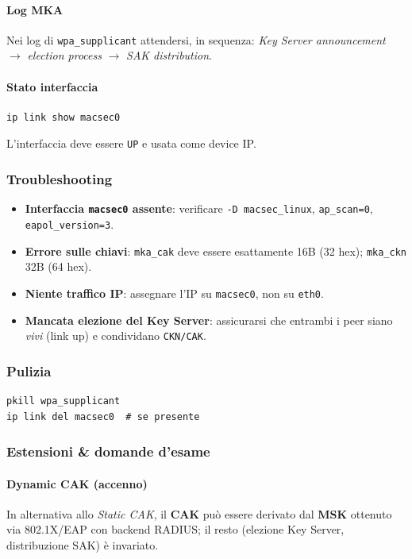 \paragraph{Log MKA}
Nei log di \texttt{wpa\_supplicant} attendersi, in sequenza: \emph{Key Server announcement} $\rightarrow$ \emph{election process} $\rightarrow$ \emph{SAK distribution}. %
\paragraph{Stato interfaccia}
\begin{verbatim}
ip link show macsec0
\end{verbatim}
L'interfaccia deve essere \texttt{UP} e usata come device IP. %

\subsubsection{Troubleshooting}
\begin{itemize}
  \item \textbf{Interfaccia \texttt{macsec0} assente}: verificare \texttt{-D macsec\_linux}, \texttt{ap\_scan=0}, \texttt{eapol\_version=3}. %
  \item \textbf{Errore sulle chiavi}: \texttt{mka\_cak} deve essere esattamente 16B (32 hex); \texttt{mka\_ckn} 32B (64 hex). %
  \item \textbf{Niente traffico IP}: assegnare l'IP su \texttt{macsec0}, non su \texttt{eth0}. %
  \item \textbf{Mancata elezione del Key Server}: assicurarsi che entrambi i peer siano \emph{vivi} (link up) e condividano \texttt{CKN/CAK}. %
\end{itemize}

\subsubsection{Pulizia}
\begin{verbatim}
pkill wpa_supplicant
ip link del macsec0  # se presente
\end{verbatim}


\subsubsection{Estensioni \& domande d'esame}
\paragraph{Dynamic CAK (accenno)}
In alternativa allo \emph{Static CAK}, il \textbf{CAK} pu\`o essere derivato dal \textbf{MSK} ottenuto via 802.1X/EAP con backend RADIUS; il resto (elezione Key Server, distribuzione SAK) \`e invariato. %
